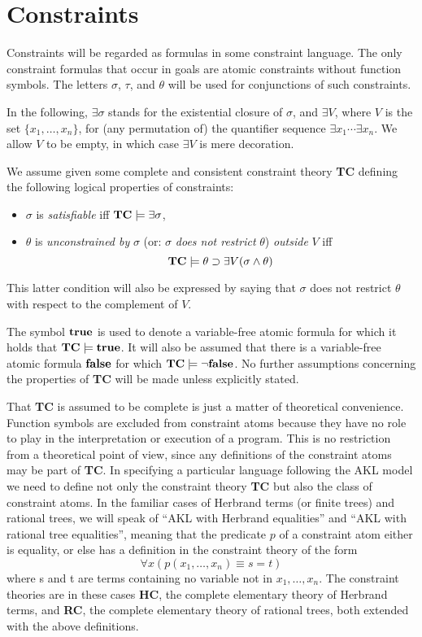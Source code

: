 \section{Constraints}\label{REF2}

Constraints will be regarded as formulas in some constraint language.
The only constraint formulas that occur in goals are atomic
constraints without function symbols.  The letters $\sigma$, $\tau$,
and $\theta$ will be used for conjunctions of such constraints.

In the following, $\exists \sigma$ stands for the existential closure
of $\sigma$, and $\exists V$, where $V$ is the set $\{x_1,\dots,x_n\}$,
for (any permutation of) the quantifier sequence $\exists x_1 \cdots
\exists x_n$.  We allow $V$ to be empty, in which case $\exists V$ is mere
decoration.

We assume given some complete and consistent constraint theory
\mbox{\bf TC} defining the following logical properties of constraints:
%
\begin{itemize}
\item $\sigma$ is {\em satisfiable} iff $\mbox{\bf TC} \models \exists \sigma$,
\item $\theta$ is {\em unconstrained by} $\sigma$ (or: $\sigma$ {\em does not restrict} $\theta$) {\em outside} $V$ iff $$\mbox{\bf TC} \models \theta \implies\exists V (\sigma \land \theta)$$
\end{itemize}
%
This latter condition will also be expressed by saying that $\sigma$
does not restrict $\theta$ with respect to the complement of $V$.

The symbol $\TRUE$ is used to denote a variable-free atomic formula
for which it holds that $\mbox{\bf TC} \models \TRUE$. It will also be
assumed that there is a variable-free atomic formula $\FALSE$ for
which $\mbox{\bf TC} \models \neg\FALSE$. No further assumptions
concerning the properties of {\bf TC} will be made unless explicitly
stated.

That {\bf TC} is assumed to be complete is just a matter of
theoretical convenience.  Function symbols are excluded from
constraint atoms because they have no role to play in the
interpretation or execution of a program. This is no restriction from
a theoretical point of view, since any definitions of the constraint
atoms may be part of {\bf TC}. In specifying a particular language
following the AKL model we need to define not only the constraint
theory {\bf TC} but also the class of constraint atoms. In the
familiar cases of Herbrand terms (or finite trees) and rational trees,
we will speak of ``AKL with Herbrand equalities'' and ``AKL with
rational tree equalities'', meaning that the predicate $p$ of a
constraint atom either is equality, or else has a definition in the
constraint theory of the form
%
$$\forall x (p(x_1, \dots, x_n) \equiv s=t)$$
%
where s and t are terms containing no variable not in $x_1, \dots,
x_n$.  The constraint theories are in these cases {\bf HC}, the
complete elementary theory of Herbrand terms, and {\bf RC}, the
complete elementary theory of rational trees, both extended with the
above definitions.

